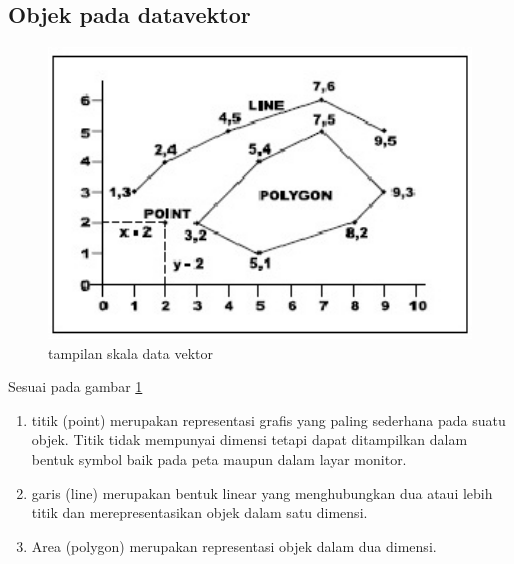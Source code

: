 \subsection {Objek pada datavektor}
\begin{figure}[ht]
\centerline{\includegraphics[width=1\textwidth] {figures/vektor02.JPG}}
\caption{tampilan skala data vektor}
\label{vektor02}
\end{figure}
Sesuai pada gambar \ref{vektor02} 
\begin{enumerate}
Objek yang dibangun terbagi menjadi tiga bagian lagi, yaitu berupa titik (point), garis (line), dan area (polygon). 
\item titik (point) merupakan representasi grafis yang paling sederhana pada suatu objek. Titik tidak mempunyai dimensi tetapi dapat ditampilkan dalam bentuk symbol baik pada peta maupun dalam layar monitor.
\item garis (line) merupakan bentuk linear yang menghubungkan dua ataui lebih titik dan merepresentasikan objek dalam satu dimensi. 
\item Area (polygon) merupakan representasi objek dalam dua dimensi.
\end{enumerate}

